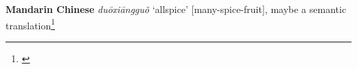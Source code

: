 \begin{etymology}\label{ety:duoxiangguo}
\textbf{Mandarin Chinese}  \textit{duōxiāngguǒ} `allspice' [many-spice-fruit], maybe a semantic translation\footnote{\textcite{mdbg}}
\end{etymology}